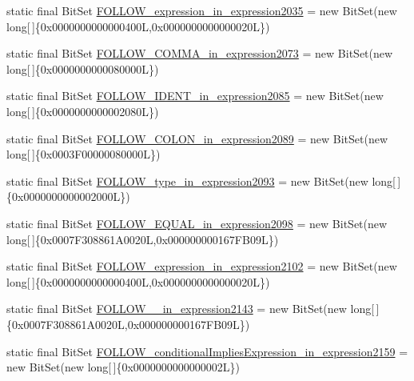 \begin{DoxyCompactItemize}
\item 
static final Bit\-Set \hyperlink{classorg_1_1tzi_1_1use_1_1parser_1_1soil_1_1_soil_parser_ad7592006e98d31bb29ce000088c71570}{F\-O\-L\-L\-O\-W\-\_\-expression\-\_\-in\-\_\-expression2035} = new Bit\-Set(new long\mbox{[}$\,$\mbox{]}\{0x0000000000000400\-L,0x0000000000000020\-L\})
\item 
static final Bit\-Set \hyperlink{classorg_1_1tzi_1_1use_1_1parser_1_1soil_1_1_soil_parser_adad797f89434e36cd2899b1d3224dd10}{F\-O\-L\-L\-O\-W\-\_\-\-C\-O\-M\-M\-A\-\_\-in\-\_\-expression2073} = new Bit\-Set(new long\mbox{[}$\,$\mbox{]}\{0x0000000000080000\-L\})
\item 
static final Bit\-Set \hyperlink{classorg_1_1tzi_1_1use_1_1parser_1_1soil_1_1_soil_parser_a6191ecb587f155b0d185605fb5a6d6a1}{F\-O\-L\-L\-O\-W\-\_\-\-I\-D\-E\-N\-T\-\_\-in\-\_\-expression2085} = new Bit\-Set(new long\mbox{[}$\,$\mbox{]}\{0x0000000000002080\-L\})
\item 
static final Bit\-Set \hyperlink{classorg_1_1tzi_1_1use_1_1parser_1_1soil_1_1_soil_parser_a60e528e23c61c8b2ee646c4a2afeca64}{F\-O\-L\-L\-O\-W\-\_\-\-C\-O\-L\-O\-N\-\_\-in\-\_\-expression2089} = new Bit\-Set(new long\mbox{[}$\,$\mbox{]}\{0x0003\-F00000080000\-L\})
\item 
static final Bit\-Set \hyperlink{classorg_1_1tzi_1_1use_1_1parser_1_1soil_1_1_soil_parser_a22dca6647b4ba1ac878ef202a85dcc1e}{F\-O\-L\-L\-O\-W\-\_\-type\-\_\-in\-\_\-expression2093} = new Bit\-Set(new long\mbox{[}$\,$\mbox{]}\{0x0000000000002000\-L\})
\item 
static final Bit\-Set \hyperlink{classorg_1_1tzi_1_1use_1_1parser_1_1soil_1_1_soil_parser_adb301b4b48b8950bcb191f29ffa58d1a}{F\-O\-L\-L\-O\-W\-\_\-\-E\-Q\-U\-A\-L\-\_\-in\-\_\-expression2098} = new Bit\-Set(new long\mbox{[}$\,$\mbox{]}\{0x0007\-F308861\-A0020\-L,0x000000000167\-F\-B09\-L\})
\item 
static final Bit\-Set \hyperlink{classorg_1_1tzi_1_1use_1_1parser_1_1soil_1_1_soil_parser_aaa94cc0bf65e6eff57b58ca4bd3de869}{F\-O\-L\-L\-O\-W\-\_\-expression\-\_\-in\-\_\-expression2102} = new Bit\-Set(new long\mbox{[}$\,$\mbox{]}\{0x0000000000000400\-L,0x0000000000000020\-L\})
\item 
static final Bit\-Set \hyperlink{classorg_1_1tzi_1_1use_1_1parser_1_1soil_1_1_soil_parser_a7248fdcc75e50cde6d3b6300ae3d22fe}{F\-O\-L\-L\-O\-W\-\_\-\_\-in\-\_\-expression2143} = new Bit\-Set(new long\mbox{[}$\,$\mbox{]}\{0x0007\-F308861\-A0020\-L,0x000000000167\-F\-B09\-L\})
\item 
static final Bit\-Set \hyperlink{classorg_1_1tzi_1_1use_1_1parser_1_1soil_1_1_soil_parser_a82f145fca68a5fd16bc8475595fa8acc}{F\-O\-L\-L\-O\-W\-\_\-conditional\-Implies\-Expression\-\_\-in\-\_\-expression2159} = new Bit\-Set(new long\mbox{[}$\,$\mbox{]}\{0x0000000000000002\-L\})

\end{DoxyCompactItemize}
